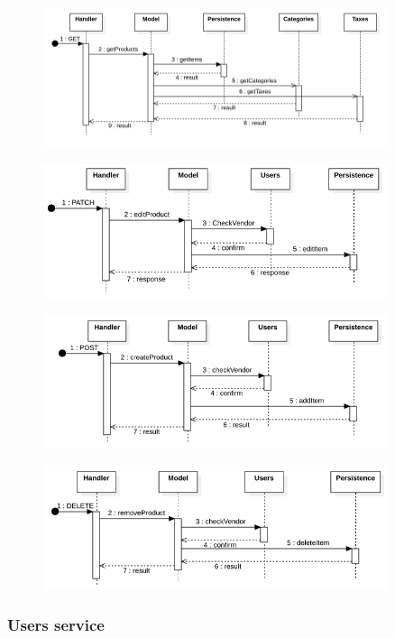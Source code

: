 \begin{figure}[H]
    \includegraphics[width=0.9\textwidth]{res/images/sequence-diagrams/products/getProducts.png}
\end{figure}

\begin{figure}[H]
    \includegraphics[width=0.9\textwidth]{res/images/sequence-diagrams/products/editProduct.png}
\end{figure}

\begin{figure}[H]
    \includegraphics[width=0.9\textwidth]{res/images/sequence-diagrams/products/createProduct.png}
\end{figure}

\begin{figure}[H]
    \includegraphics[width=0.9\textwidth]{res/images/sequence-diagrams/products/removeProduct.png}
\end{figure}


\subsubsection{Users service}

